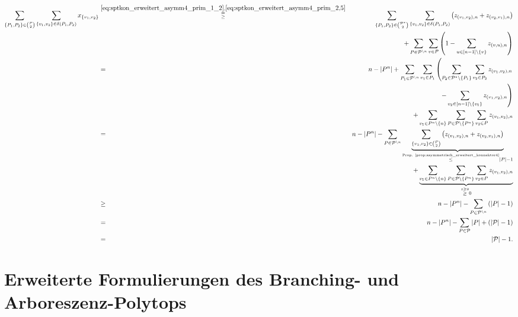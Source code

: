 \documentclass[10p,a4paper,BCOR = 12mm, DIV=15]{scrbook}
\begin{document}
\begin{bew}
\begin{eqnarray*}
\sum_{\left\{P_1, P_2\right\} \in {\mathcal{P} \choose 2}} \sum_{\left\{v_1, v_2\right\} \in {\delta\left(P_1, P_2\right)}} x_{\left\{v_1, v_2\right\}} & \stackrel{\eqref{eq:sptkon_erweitert_asymm4_prim_1_2}, \eqref{eq:sptkon_erweitert_asymm4_prim_2,5}}{\substack{= \\ \geq}} & \sum_{\left\{P_1, P_2\right\} \in
{\mathcal{P}^* \choose 2}} \sum_{\left\{v_1, v_2\right\} \in {\delta\left(P_1, P_2\right)}} \left(z_{\left(v_1, v_2\right), n} + z_{\left(v_2, v_1\right), n}\right) \\
& & + \sum_{P \in \mathcal{P}^{\backslash n}} \sum_{v \in P} \left(1 - \sum_{u\in[n-1]\backslash\left\{v\right\}} z_{\left(v, u\right), n}\right) \\
& = & n - \left|P^n\right| + \sum_{P_1 \in \mathcal{P}^{\backslash n}} \sum_{v_1 \in P_1} \left(\sum_{P_2 \in \mathcal{P}^* \backslash \left\{P_1\right\}} \sum_{v_2 \in P_2} z_{\left(v_1, v_2\right), n} \right. \\
& & \left. - \sum_{v_2\in[n-1]\backslash\left\{v_1\right\}} z_{\left(v_1, v_2\right), n} \right) \\
& & + \sum_{v_1 \in P^n \backslash \left\{n\right\}} \sum_{P \in \mathcal{P} \backslash \left\{ P^n \right\}} \sum_{v_2 \in P} z_{\left(v_1, v_2\right), n} \\
& = & n - \left|P^n\right| - \sum_{P \in \mathcal{P}^{\backslash n}} \underbrace{\sum_{\left\{v_1, v_2\right\} \in {P \choose 2}} \left(z_{\left(v_1, v_2\right), n} + z_{\left(v_2, v_1\right), n}\right)}_{\stackrel{\textnormal{Prop. \ref{prop:asymmetrisch_erweitert_konnektor4}}}{\leq} \left|P\right| - 1} \\
& & + \underbrace{\sum_{v_1 \in P^n \backslash \left\{n\right\}} \sum_{P \in \mathcal{P} \backslash \left\{ P^n \right\}} \sum_{v_2 \in P} z_{\left(v_1, v_2\right), n}}_{\stackrel{z \geq 0}{\geq} 0} \\
& \geq & n - \left|P^n\right| - \sum_{P \in \mathcal{P}^{\backslash n}} \left(\left|P\right| - 1\right) \\
& = & n - \left|P^n\right| - \sum_{P \in \mathcal{P}} \left|P\right| +  \left(\left|\mathcal{P}\right| - 1\right) \\
& = & \left|\mathcal{P}\right| - 1.
\end{eqnarray*}
\end{bew}

\chapter{Erweiterte Formulierungen des Branching- und Arboreszenz-Polytops}
\end{document}
